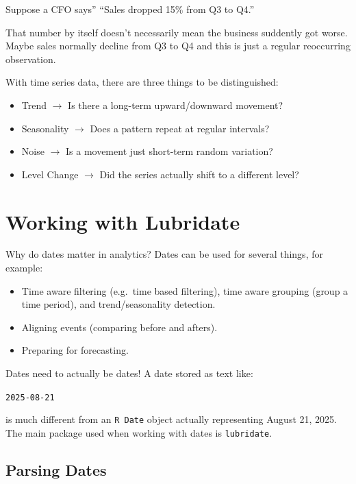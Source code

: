 \documentclass[
  letterpaper,
  DIV=11,
  numbers=noendperiod]{scrreprt}
\providecommand{\tightlist}{%
  \setlength{\itemsep}{0pt}\setlength{\parskip}{0pt}}
\begin{document}
Suppose a CFO says'' ``Sales dropped 15\% from Q3 to Q4.''

That number by itself doesn't necessarily mean the business suddently
got worse. Maybe sales normally decline from Q3 to Q4 and this is just a
regular reoccurring observation.

With time series data, there are three things to be distinguished:

\begin{itemize}
\tightlist
\item
  Trend \(\rightarrow\) Is there a long-term upward/downward movement?
\item
  Seasonality \(\rightarrow\) Does a pattern repeat at regular
  intervals?
\item
  Noise \(\rightarrow\) Is a movement just short-term random variation?
\item
  Level Change \(\rightarrow\) Did the series actually shift to a
  different level?
\end{itemize}

\section{Working with Lubridate}\label{working-with-lubridate}

Why do dates matter in analytics? Dates can be used for several things,
for example:

\begin{itemize}
\tightlist
\item
  Time aware filtering (e.g.~time based filtering), time aware grouping
  (group a time period), and trend/seasonality detection.
\item
  Aligning events (comparing before and afters).
\item
  Preparing for forecasting.
\end{itemize}

Dates need to actually be dates! A date stored as text like:

\texttt{\textquotesingle{}2025-08-21\textquotesingle{}}

is much different from an \texttt{R\ Date} object actually representing
August 21, 2025. The main package used when working with dates is
\texttt{lubridate}.

\subsection{Parsing Dates}\label{parsing-dates}
\end{document}
